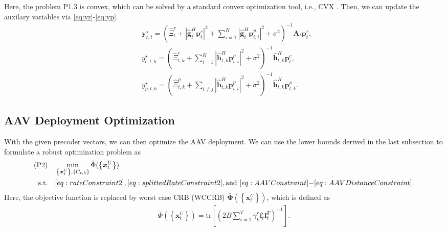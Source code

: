\documentclass[twocolumn,journal]{IEEEtran}
\begin{document}
Here, the problem P1.3 is convex, which can be solved by a standard convex optimization tool, i.e., CVX \cite{cvx}. Then, we can update the auxilary variables via \eqref{eq:yr}-\eqref{eq:yp}. 
\begin{subequations}
\begin{align}
    &\boldsymbol{y}_{r,t}^{\star} = \left(\hat{\Xi}^{r}_{t} + \left| \hat{\boldsymbol{g}}^{H}_{t}\boldsymbol{p}^{c}_{t}\right|^2 + \sum_{i=1}^{K}\left| \hat{\boldsymbol{g}}^{H}_{t}\boldsymbol{p}^{p}_{t,i}\right|^2 + \sigma^2\right)^{-1}\mathbf{A}_t\boldsymbol{p}^{r}_{t},\label{eq:yr}\\
    &y_{c,t,k}^{\star} = \left( \hat{\Xi}^{c}_{t,k} +  \sum_{i=1}^{K}\left| \hat{\boldsymbol{h}}^{H}_{t,k}\boldsymbol{p}^{p}_{t,i}\right|^2 + \sigma^2 \right)^{-1}\hat{\boldsymbol{h}}^{H}_{t,k}\boldsymbol{p}^{c}_{t},\label{eq:yc}\\
    &y_{p,t,k}^{\star} = \left( \hat{\Xi}^{p}_{t,k} +  \sum_{i\neq j}\left| \hat{\boldsymbol{h}}^{H}_{t,k}\boldsymbol{p}^{p}_{t,i}\right|^2 + \sigma^2 \right)^{-1}\hat{\boldsymbol{h}}^{H}_{t,k}\boldsymbol{p}^{p}_{t,k}.\label{eq:yp}
\end{align}
\end{subequations}
\subsection{AAV Deployment Optimization}
With the given precoder vectors, we can then optimize the AAV deployment. We can use the lower bounds derived in the last subsection to formulate a robust optimization problem as 
\begin{align}
 (\text{P2})\quad&\min_{\left\{\boldsymbol{x}^{U}_{t}\right\},\left\{C_{t,k}\right\}} \bar{{\Phi}}(\left\{\boldsymbol{x}^{U}_{t}\right\})\label{eq:objP2}\\
 \text{s.t.}\quad& \eqref{eq:rateConstraint2}, \eqref{eq:splittedRateConstraint2}, \text{and } \eqref{eq:AAVConstraint}\mbox{-}\eqref{eq:AAVDistanceConstraint}.\notag
\end{align}
Here, the objective function is replaced by worst case CRB (WCCRB) \(\bar{\mathbf{\Phi}}(\left\{\boldsymbol{x}^{U}_{t}\right\})\), which is defined as
\begin{align}
 \bar{{\Phi}}(\left\{\boldsymbol{x}^{U}_{t}\right\}) = \text{tr}\left[\left(2B\sum_{t=1}^{T} \bar{\gamma}_{k}^{r}\boldsymbol{f}_{t}\boldsymbol{f}^{T}_{t}\right)^{-1}\right].
\end{align}
\end{document}
